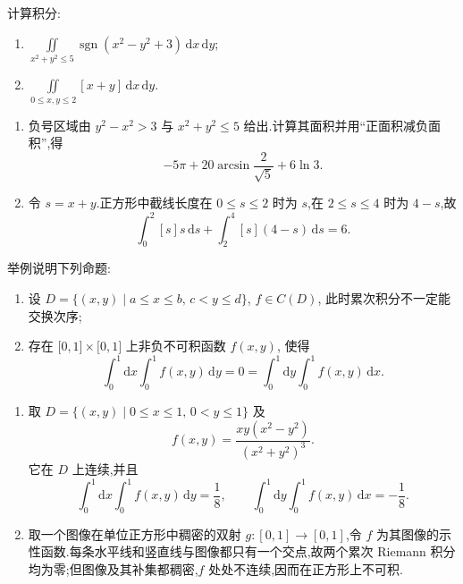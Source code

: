 \begin{example}
    计算积分:
    \begin{enumerate}
        \item $\displaystyle\iint\limits_{x^2+y^2\leq5}\operatorname{sgn}(x^2-y^2+3)\,\mathrm{d}x\,\mathrm{d}y$;
        \item $\displaystyle\iint\limits_{0\leq x,y\leq2}[x+y]\,\mathrm{d}x\,\mathrm{d}y$.
    \end{enumerate}
\end{example}
\exampleblank

\begin{solution}
    \leavevmode
    \begin{enumerate}
        \item 负号区域由 $y^2-x^2>3$ 与 $x^2+y^2\leq5$ 给出.计算其面积并用``正面积减负面积'',得
              \[
                  -5\pi+20\arcsin\dfrac{2}{\sqrt5}+6\ln3.
              \]
        \item 令 $s=x+y$.正方形中截线长度在 $0\leq s\leq2$ 时为 $s$,在 $2\leq s\leq4$ 时为 $4-s$,故
              \[
                  \displaystyle\int_0^2[s]s\,\mathrm{d}s+\int_2^4[s](4-s)\,\mathrm{d}s=6.
              \]
    \end{enumerate}
\end{solution}

\begin{example}
    举例说明下列命题:
    \begin{enumerate}
        \item 设 $D=\{(x,y)\mid a\leq x\leq b,\,c<y\leq d\}$, $f\in C(D)$, 此时累次积分不一定能交换次序;
        \item 存在 $\lbrack0,1\rbrack\times\lbrack0,1\rbrack$ 上非负不可积函数 $f(x,y)$, 使得
              \[
                  \displaystyle\int_0^1\mathrm{d}x\int_0^1f(x,y)\,\mathrm{d}y
                  =0
                  =\int_0^1\mathrm{d}y\int_0^1f(x,y)\,\mathrm{d}x.
              \]
    \end{enumerate}
\end{example}
\exampleblank

\begin{solution}
    \leavevmode
    \begin{enumerate}
        \item 取 $D=\{(x,y)\mid0\leq x\leq1,\,0<y\leq1\}$ 及
              \[
                  f(x,y)=\dfrac{xy(x^2-y^2)}{(x^2+y^2)^3}.
              \]
              它在 $D$ 上连续,并且
              \[
                  \displaystyle\int_0^1\!\mathrm{d}x\int_0^1f(x,y)\,\mathrm{d}y=\dfrac{1}{8},
                  \qquad
                  \int_0^1\!\mathrm{d}y\int_0^1f(x,y)\,\mathrm{d}x=-\dfrac{1}{8}.
              \]
        \item 取一个图像在单位正方形中稠密的双射 $g:[0,1]\to[0,1]$,令 $f$ 为其图像的示性函数.每条水平线和竖直线与图像都只有一个交点,故两个累次 Riemann 积分均为零;但图像及其补集都稠密,$f$ 处处不连续,因而在正方形上不可积.
    \end{enumerate}
\end{solution}



